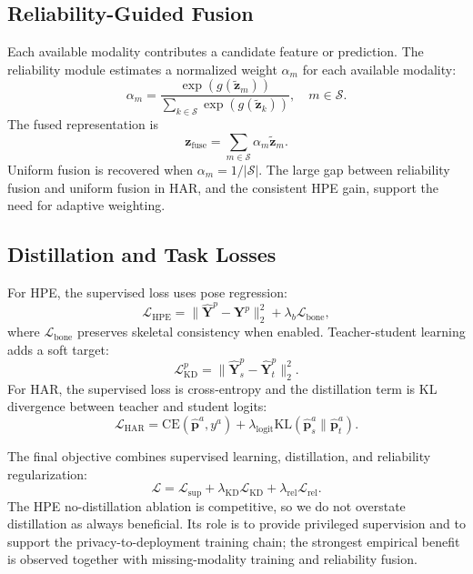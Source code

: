 \documentclass[journal]{IEEEtran}
\begin{document}
\subsection{Reliability-Guided Fusion}

Each available modality contributes a candidate feature or prediction. The reliability module estimates a normalized weight $\alpha_m$ for each available modality:
\begin{equation}
    \alpha_m =
    \frac{\exp(g(\tilde{\mathbf{z}}_{m}))}
    {\sum_{k\in\mathcal{S}}\exp(g(\tilde{\mathbf{z}}_{k}))},\quad m\in\mathcal{S}.
\end{equation}
The fused representation is
\begin{equation}
    \mathbf{z}_{\mathrm{fuse}}=\sum_{m\in\mathcal{S}}\alpha_m \tilde{\mathbf{z}}_{m}.
\end{equation}
Uniform fusion is recovered when $\alpha_m=1/|\mathcal{S}|$. The large gap between reliability fusion and uniform fusion in HAR, and the consistent HPE gain, support the need for adaptive weighting.

\subsection{Distillation and Task Losses}

For HPE, the supervised loss uses pose regression:
\begin{equation}
    \mathcal{L}_{\mathrm{HPE}} =
    \|\hat{\mathbf{Y}}^{p}-\mathbf{Y}^{p}\|_{2}^{2}
    + \lambda_{b}\mathcal{L}_{\mathrm{bone}},
\end{equation}
where $\mathcal{L}_{\mathrm{bone}}$ preserves skeletal consistency when enabled. Teacher-student learning adds a soft target:
\begin{equation}
    \mathcal{L}_{\mathrm{KD}}^{p} =
    \|\hat{\mathbf{Y}}^{p}_{s}-\hat{\mathbf{Y}}^{p}_{t}\|_{2}^{2}.
\end{equation}
For HAR, the supervised loss is cross-entropy and the distillation term is KL divergence between teacher and student logits:
\begin{equation}
    \mathcal{L}_{\mathrm{HAR}} =
    \mathrm{CE}(\hat{\mathbf{p}}^{a},y^{a})
    + \lambda_{\mathrm{logit}}\mathrm{KL}
    (\hat{\mathbf{p}}^{a}_{s}\|\hat{\mathbf{p}}^{a}_{t}).
\end{equation}

The final objective combines supervised learning, distillation, and reliability regularization:
\begin{equation}
    \mathcal{L}=
    \mathcal{L}_{\mathrm{sup}}
    +\lambda_{\mathrm{KD}}\mathcal{L}_{\mathrm{KD}}
    +\lambda_{\mathrm{rel}}\mathcal{L}_{\mathrm{rel}}.
\end{equation}
The HPE no-distillation ablation is competitive, so we do not overstate distillation as always beneficial. Its role is to provide privileged supervision and to support the privacy-to-deployment training chain; the strongest empirical benefit is observed together with missing-modality training and reliability fusion.
\end{document}
